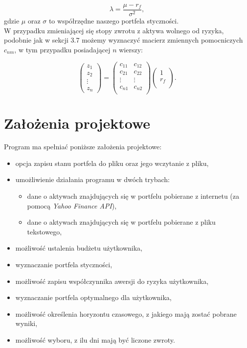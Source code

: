 \documentclass[magister]{dyplom}
\begin{document}
\begin{equation}
	\lambda = \frac{\mu - r_f}{{\sigma}^2},
\end{equation}
gdzie $\mu$ oraz $\sigma$ to współrzędne naszego portfela styczności.\\

W przypadku zmieniającej się stopy zwrotu z aktywa wolnego od ryzyka, podobnie jak w sekcji 3.7 możemy wyznaczyć macierz zmiennych pomocniczych $c_{nm}$, w tym przypadku posiadającej $n$ wierszy:

\begin{equation}
	\left( \begin{array}{c}
		z_1\\
		z_2\\
		\vdots\\
		z_n
	\end{array} \right) = 
	\left( \begin{array}{cc}
		c_{11}& c_{12}\\
		c_{21}& c_{22}\\
		\vdots& \vdots\\
		c_{n1}& c_{n2}\\
	\end{array} \right)
	\left( \begin{array}{c}
		1\\
		r_f\\
	\end{array} \right).
\end{equation}

\chapter{Założenia projektowe}

Program ma spełniać poniższe założenia projektowe:
\begin{itemize}
	\item opcja zapisu stanu portfela do pliku oraz jego wczytanie z pliku,
	\item umożliwienie działania programu w dwóch trybach:
	\begin{itemize}
		\item dane o aktywach znajdujących się w portfelu pobierane z internetu (za pomocą \textit{Yahoo Finance API}),
		\item dane o aktywach znajdujących się w portfelu pobierane z pliku tekstowego,
	\end{itemize}
	\item możliwość ustalenia budżetu użytkownika,
	\item wyznaczanie portfela styczności,
	\item możliwość zapisu współczynnika awersji do ryzyka użytkownika,
	\item wyznaczanie portfela optymalnego dla użytkownika,
	\item możliwość określenia horyzontu czasowego, z jakiego mają zostać pobrane wyniki,
	\item możliwość wyboru, z ilu dni mają być liczone zwroty.
\end{itemize}
\end{document}
